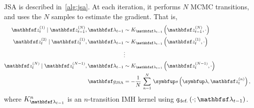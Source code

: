 \begin{proofEnd}

  JSA is described in~\cref{alg:jsa}. 
  At each iteration, it performs \(N\) MCMC transitions, and uses the \(N\) samples to estimate the gradient.
  That is,
  \begin{align*}
    \rvvz^{(1)}_{t} \mid \rvvz_{t-1}^{(N)}, \rvvlambda_{t-1} &\sim K_{\rvvlambda_{t-1}}\left(\rvvz_{t-1}^{(N)}, \cdot\right) \\
    \rvvz^{(2)}_{t} \mid \rvvz^{(1)}_{t}, \rvvlambda_{t-1}  &\sim K_{\rvvlambda_{t-1}}\left(\rvvz_{t}^{(1)}, \cdot\right) \\
    &\vdots
    \\
    \rvvz^{(N)}_{t} \mid \rvvz^{(N-1)}_{t}, \rvvlambda_{t-1}  &\sim K_{\rvvlambda_{t-1}}\left(\rvvz_{t}^{(N-1)}, \cdot\right)
    \\
    \rvvg_{\text{JSA}} &= -\frac{1}{N}\,\sum^{N}_{n=1} \, \vs\left(\vlambda, \rvvz^{(n)}_t\right),
  \end{align*}
  where \(K_{\rvvlambda_{t-1}}^n\) is an \(n\)-transition IMH kernel using \(q_{\text{def.}}\left(\cdot; \rvvlambda_{t-1}\right)\).


\end{proofEnd}
